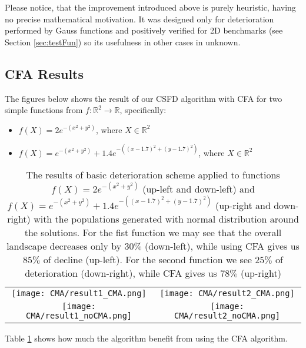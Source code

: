 Please notice, that the improvement introduced above is purely heuristic,
having no precise mathematical motivation. It was designed only
for deterioration performed by Gauss functions and positively verified for
2D benchmarks (see Section \ref{sec:testFun}) so its usefulness 
in other cases in unknown.

\subsection{CFA Results}

The figures below shows the result of our CSFD algorithm with CFA for two
simple functions from $f:\mathbb{R}^2 \rightarrow \mathbb{R}$, specifically:
\begin{itemize}
  \item $f(X) = 2e^{-(x^2 + y^2)}$, where $X \in \mathbb{R}^2$
  \item $f(X) = e^{-(x^2 + y^2)}+1.4e^{-((x-1.7)^2 + (y-1.7)^2)}$, where $X \in
  \mathbb{R}^2$
\end{itemize}

\begin{table}[ht]
    \caption{The results of basic deterioration scheme applied to functions 
    $f(X) = 2e^{-(x^2 +y^2)}$ (up-left and down-left) and $f(X) = e^{-(x^2 +
    y^2)}+1.4e^{-((x-1.7)^2 + (y-1.7)^2)}$ (up-right and down-right) with the
    populations generated with normal distribution around the solutions. For
    the fist function we may see that the 
  	overall landscape decreases only by $30\%$ (down-left), while using
  	CFA gives us $85\%$ of decline (up-left). For the second function we
  	see $25\%$ of deterioration (down-right), while CFA gives us $78\%$
  	(up-right)}
    \centering
    \begin{tabular}{cc}
    \texttt{[image: CMA/result1\_CMA.png]} &
    \texttt{[image: CMA/result2\_CMA.png]} \\
    \newline
    \texttt{[image: CMA/result1\_noCMA.png]} &
    \texttt{[image: CMA/result2\_noCMA.png]} \\
    \end{tabular}
    \label{tab:cfa}
\end{table}%

Table \ref{tab:cfa} shows how much the algorithm benefit
from using the CFA algorithm.
